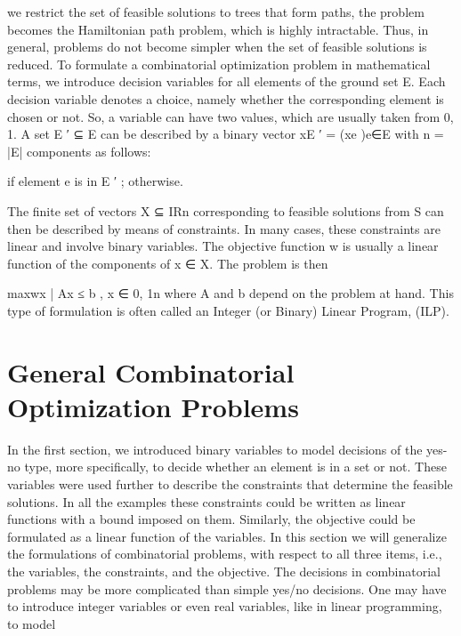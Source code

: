 \documentclass[titlepage]{book}
\begin{document}
we restrict the set of feasible solutions to trees that form paths, the problem becomes the Hamiltonian
path problem, which is highly intractable. Thus, in general, problems do not become simpler when the
set of feasible solutions is reduced.
To formulate a combinatorial optimization problem in mathematical terms, we introduce decision variables for all elements of the ground set E. Each decision variable denotes a choice, namely whether the
corresponding element is chosen or not. So, a variable can have two values, which are usually taken from
{0, 1}. A set E ′ ⊆ E can be described by a binary vector xE ′ = (xe )e∈E with n = |E| components as
follows:


if element e is in E ′ ;
otherwise.

The finite set of vectors X ⊆ IRn corresponding to feasible solutions from S can then be described by
means of constraints. In many cases, these constraints are linear and involve binary variables. The
objective function w is usually a linear function of the components of x ∈ X. The problem is then

max{wx | Ax ≤ b , x ∈ {0, 1}n }
where A and b depend on the problem at hand. This type of formulation is often called an Integer (or
Binary) Linear Program, (ILP).

\section{General Combinatorial Optimization Problems}

In the first section, we introduced binary variables to model decisions of the yes-no type, more specifically,
to decide whether an element is in a set or not. These variables were used further to describe the
constraints that determine the feasible solutions. In all the examples these constraints could be written
as linear functions with a bound imposed on them. Similarly, the objective could be formulated as a linear
function of the variables. In this section we will generalize the formulations of combinatorial problems,
with respect to all three items, i.e., the variables, the constraints, and the objective.
The decisions in combinatorial problems may be more complicated than simple yes/no decisions. One
may have to introduce integer variables or even real variables, like in linear programming, to model
\end{document}
